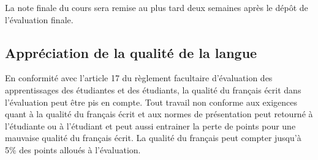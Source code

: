 \documentclass[12]{article}
\begin{document}
    La note finale du cours sera remise au plus tard deux semaines après le
	dépôt de l'évaluation finale.

    \subsection*{Appréciation de la qualité de la langue}

    En conformité avec l'article 17 du règlement facultaire d'évaluation
    des apprentissages des étudiantes et des étudiants, la qualité du français
    écrit dans l’évaluation peut être pis en compte. Tout travail non conforme
    aux exigences quant à la qualité du français écrit et aux normes de
    présentation  peut retourné à l'étudiante ou à l'étudiant et peut aussi
    entrainer la perte de points pour une mauvaise qualité du français écrit.
    La qualité du français peut compter jusqu'à 5\% des points alloués à
    l'évaluation.

	
\end{document}
